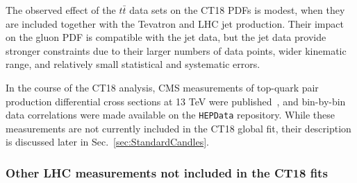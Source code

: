The observed effect of the $t\bar t$ data sets on the CT18 PDFs is modest, when they are included together with the Tevatron and LHC jet production. 
Their impact on the gluon PDF is compatible with the jet data, but the jet data provide stronger constraints due to their larger numbers of data points, wider kinematic range, and relatively small statistical and systematic errors.

In the course of the CT18 analysis, CMS measurements of top-quark pair production differential cross sections at 13 TeV were published~\cite{Sirunyan:2018ucr}, 
and bin-by-bin data correlations were made available on the \texttt{HEPData} repository.
While these measurements are not currently included in the CT18 global fit, their description is discussed later in Sec.~\ref{sec:StandardCandles}.
 
\subsubsection{Other LHC measurements not included in the CT18 fits
\label{sec:DataOther}
}


